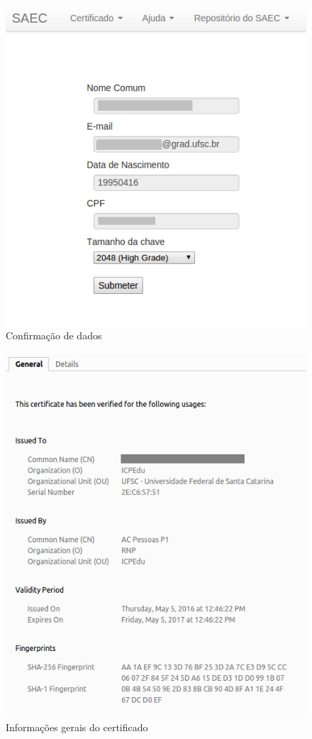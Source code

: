 \begin{figure}[ht]
     \centering
     \includegraphics[scale=0.5]{images/emitir3.png}
     \caption{Confirmação de dados}
     \label{fig:emissao3}
\end{figure}

\begin{figure}[ht]
     \centering
     \includegraphics[scale=0.5]{images/geralcert.png}
     \caption{Informações gerais do certificado}
     \label{fig:geralcert}
\end{figure}

